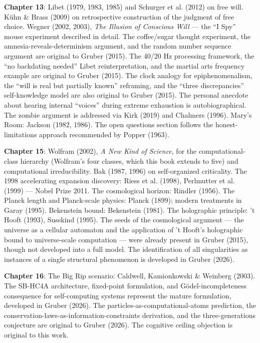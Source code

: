 \documentclass[11pt, twoside, openright]{book}
\begin{document}
\textbf{Chapter 13}: Libet (1979, 1983, 1985) and Schurger et al. (2012) on free will. Kühn \& Brass (2009) on retrospective construction of the judgment of free choice. Wegner (2002, 2003), \textit{The Illusion of Conscious Will} --- the ``I Spy'' mouse experiment described in detail. The coffee/sugar thought experiment, the amnesia-reveals-determinism argument, and the random number sequence argument are original to Gruber (2015). The 40/20 Hz processing framework, the ``no backdating needed'' Libet reinterpretation, and the martial arts frequency example are original to Gruber (2015). The clock analogy for epiphenomenalism, the ``will is real but partially known'' reframing, and the ``three discrepancies'' self-knowledge model are also original to Gruber (2015). The personal anecdote about hearing internal ``voices'' during extreme exhaustion is autobiographical. The zombie argument is addressed via Kirk (2019) and Chalmers (1996). Mary's Room: Jackson (1982, 1986). The open questions section follows the honest-limitations approach recommended by Popper (1963).

\textbf{Chapter 15}: Wolfram (2002), \textit{A New Kind of Science}, for the computational-class hierarchy (Wolfram's four classes, which this book extends to five) and computational irreducibility. Bak (1987, 1996) on self-organized criticality. The 1998 accelerating expansion discovery: Riess et al. (1998), Perlmutter et al. (1999) --- Nobel Prize 2011. The cosmological horizon: Rindler (1956). The Planck length and Planck-scale physics: Planck (1899); modern treatments in Garay (1995). Bekenstein bound: Bekenstein (1981). The holographic principle: 't Hooft (1993), Susskind (1995). The seeds of the cosmological argument --- the universe as a cellular automaton and the application of 't Hooft's holographic bound to universe-scale computation --- were already present in Gruber (2015), though not developed into a full model. The identification of all singularities as instances of a single structural phenomenon is developed in Gruber (2026).

\textbf{Chapter 16}: The Big Rip scenario: Caldwell, Kamionkowski \& Weinberg (2003). The SB-HC4A architecture, fixed-point formulation, and Gödel-incompleteness consequence for self-computing systems represent the mature formulation, developed in Gruber (2026). The particles-as-computational-atoms prediction, the conservation-laws-as-information-constraints derivation, and the three-generations conjecture are original to Gruber (2026). The cognitive ceiling objection is original to this work.
\end{document}
